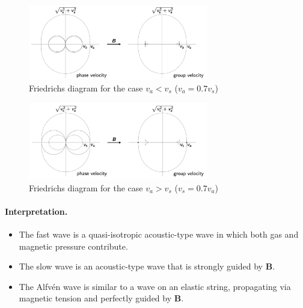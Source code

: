 \documentclass{jknotes}
\newcommand{\B}{\symbf{B}}
\begin{document}
\begin{figure}
	\centering
	\includegraphics[width=0.7\textwidth]{friedrichs_2.png}
	\caption{Friedrichs diagram for the case $v_a < v_s$ ($v_a = 0.7 v_s$)}
	\label{fig:fd1}
\end{figure}
\begin{figure}
	\centering
	\includegraphics[width=0.7\textwidth]{friedrichs_1.png}
	\caption{Friedrichs diagram for the case $v_a > v_s$ ($v_s = 0.7 v_a$)}
	\label{fig:fd2}
\end{figure}

\paragraph{Interpretation.}
\begin{itemize}
	\item The fast wave is a quasi-isotropic acoustic-type wave in which both
		gas and magnetic pressure contribute.
	\item The slow wave is an acoustic-type wave that is strongly guided by
		$\B$.
	\item The Alfv\'{e}n wave is similar to a wave on an elastic string,
		propagating via magnetic tension and perfectly guided by $\B$.
\end{itemize}
\end{document}
